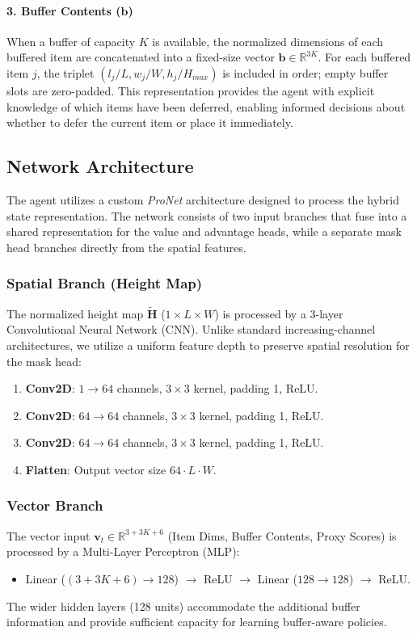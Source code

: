 \documentclass[runningheads]{llncs}
\begin{document}
\paragraph{3. Buffer Contents ($\mathbf{b}$)}
When a buffer of capacity $K$ is available, the normalized dimensions of each buffered item are concatenated into a fixed-size vector $\mathbf{b} \in \mathbb{R}^{3K}$. For each buffered item $j$, the triplet $(l_j/L, w_j/W, h_j/H_{max})$ is included in order; empty buffer slots are zero-padded. This representation provides the agent with explicit knowledge of which items have been deferred, enabling informed decisions about whether to defer the current item or place it immediately.

\subsection{Network Architecture}
The agent utilizes a custom \textit{ProNet} architecture designed to process the hybrid state representation. The network consists of two input branches that fuse into a shared representation for the value and advantage heads, while a separate mask head branches directly from the spatial features.

\subsubsection{Spatial Branch (Height Map)}
The normalized height map $\tilde{\mathbf{H}}$ ($1 \times L \times W$) is processed by a 3-layer Convolutional Neural Network (CNN). Unlike standard increasing-channel architectures, we utilize a uniform feature depth to preserve spatial resolution for the mask head:
\begin{enumerate}
    \item \textbf{Conv2D}: $1 \to 64$ channels, $3\times3$ kernel, padding 1, ReLU.
    \item \textbf{Conv2D}: $64 \to 64$ channels, $3\times3$ kernel, padding 1, ReLU.
    \item \textbf{Conv2D}: $64 \to 64$ channels, $3\times3$ kernel, padding 1, ReLU.
    \item \textbf{Flatten}: Output vector size $64 \cdot L \cdot W$.
\end{enumerate}

\subsubsection{Vector Branch}
The vector input $\mathbf{v}_t \in \mathbb{R}^{3 + 3K + 6}$ (Item Dims, Buffer Contents, Proxy Scores) is processed by a Multi-Layer Perceptron (MLP):
\begin{itemize}
    \item Linear ($(3 + 3K + 6) \to 128$) $\to$ ReLU $\to$ Linear ($128 \to 128$) $\to$ ReLU.
\end{itemize}
The wider hidden layers (128 units) accommodate the additional buffer information and provide sufficient capacity for learning buffer-aware policies.
\end{document}
